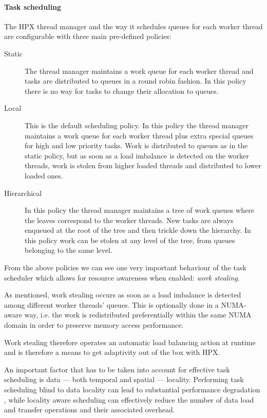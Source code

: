\paragraph{Task scheduling}
The HPX thread manager and the way it schedules queues for each worker thread are configurable with three main pre-defined policies\cite{heller2017hpx,amatya2014parallel}:
\begin{description}
	\item [Static] The thread manager maintains a work queue for each worker thread and tasks are distributed to queues in a round robin fashion. In this policy there is no way for tasks to change their allocation to queues.
	\item [Local] This is the default scheduling policy. In this policy the thread manager maintains a work queue for each worker thread plus extra special queues for high and low priority tasks. Work is distributed to queues as in the static policy, but as soon as a load imbalance is detected on the worker threads, work is stolen from higher loaded threads and distributed to lower loaded ones.
	\item [Hierarchical] In this policy the thread manager maintains a tree of work queues where the leaves correspond to the worker threads. New tasks are always enqueued at the root of the tree and then trickle down the hierarchy. In this policy work can be stolen at any level of the tree, from queues belonging to the same level.
\end{description}

From the above policies we can see one very important behaviour of the task scheduler which allows for resource awareness when enabled: \emph{work stealing}.

As mentioned, work stealing occurs as soon as a load imbalance is detected among different worker threads' queues.
This is optionally done in a NUMA-aware way, i.e. the work is redistributed preferentially within the same NUMA domain in order to preserve memory access performance.

Work stealing therefore operates an automatic load balancing action at runtime and is therefore a means to get adaptivity out of the box with HPX.

An important factor that has to be taken into account for effective task scheduling is data --- both temporal and spatial --- locality. Performing task scheduling blind to data locality can lead to substantial performance degradation \cite{connelly1994workload}, while locality aware scheduling can effectively reduce the number of data load and transfer operations and their associated overhead.

